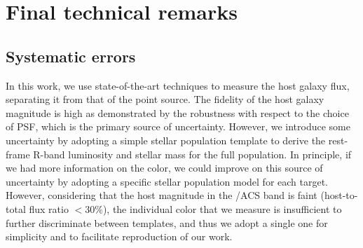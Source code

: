 \documentclass[apj]{emulateapj}
\begin{document}
\section{Final technical remarks}
\label{sec:dis}


%

\subsection{Systematic errors}

In this work, we use state-of-the-art techniques to measure the host galaxy flux, separating it from that of the point source. The fidelity of the host galaxy magnitude is high as demonstrated by the robustness with respect to the choice of PSF, which is the primary source of uncertainty. However, we introduce some uncertainty by adopting a simple stellar population template to derive the rest-frame R-band luminosity and stellar mass for the full population. In principle, if we had more information on the color, we could improve on this source of uncertainty by adopting a specific stellar population model for each target. However, considering that the host magnitude in the \hst/ACS band is faint (host-to-total flux ratio $< 30\%$), the individual color that we measure is insufficient to further discriminate between templates, and thus we adopt a single one for simplicity and to facilitate reproduction of our work.
\end{document}
